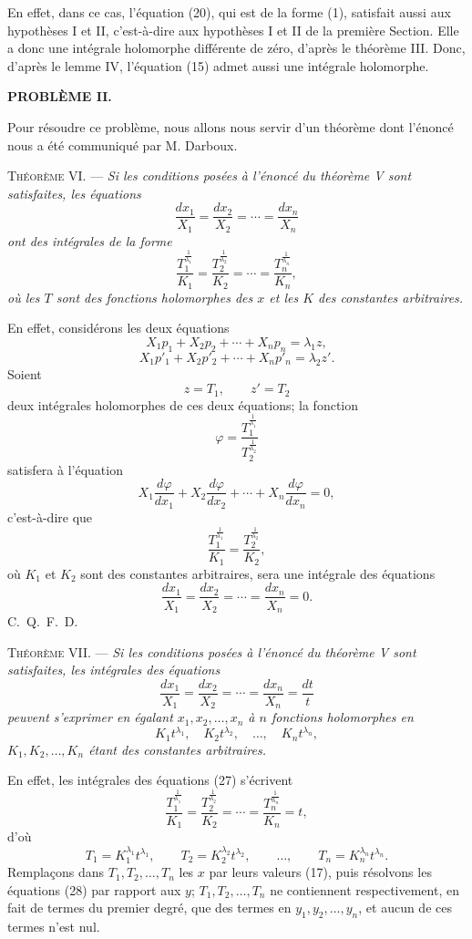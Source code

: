 \documentclass[11pt]{article}
\begin{document}
En effet, dans ce cas, l’équation (20), qui est de la forme (1), satisfait aussi aux hypothèses I et II, c’est-à-dire aux hypothèses I et II de la première Section. Elle a donc une intégrale holomorphe différente de zéro, d’après le théorème III. Donc, d’après le lemme IV, l’équation (15) admet aussi une intégrale holomorphe.

\begin{center}
{\bfseries PROBLÈME II.}
\end{center}

Pour résoudre ce problème, nous allons nous servir d’un théorème dont l’énoncé nous a été communiqué par M. Darboux.

\noindent\textsc{Théorème VI.} --- \emph{Si les conditions posées à l’énoncé du théorème V sont satisfaites, les équations}
\[
\frac{dx_1}{X_1}=\frac{dx_2}{X_2}=\cdots=\frac{dx_n}{X_n}
\]
\emph{ont des intégrales de la forme}
\[
\frac{T_1^{\frac1{\lambda_1}}}{K_1}
=
\frac{T_2^{\frac1{\lambda_2}}}{K_2}
=\cdots=
\frac{T_n^{\frac1{\lambda_n}}}{K_n},
\]
\emph{où les $T$ sont des fonctions holomorphes des $x$ et les $K$ des constantes arbitraires.}

En effet, considérons les deux équations
\[
X_1p_1+X_2p_2+\cdots+X_np_n=\lambda_1z,
\]
\[
X_1p'_1+X_2p'_2+\cdots+X_np'_n=\lambda_2z'.
\]
Soient
\[
z=T_1,\qquad z'=T_2
\]
deux intégrales holomorphes de ces deux équations; la fonction
\[
\varphi=\frac{T_1^{\frac1{\lambda_1}}}{T_2^{\frac1{\lambda_2}}}
\]
satisfera à l’équation
\[
X_1\frac{d\varphi}{dx_1}+X_2\frac{d\varphi}{dx_2}+\cdots+X_n\frac{d\varphi}{dx_n}=0,
\]
c’est-à-dire que
\[
\frac{T_1^{\frac1{\lambda_1}}}{K_1}
=
\frac{T_2^{\frac1{\lambda_2}}}{K_2},
\]
où $K_1$ et $K_2$ sont des constantes arbitraires, sera une intégrale des équations
\[
\frac{dx_1}{X_1}=\frac{dx_2}{X_2}=\cdots=\frac{dx_n}{X_n}=0.
\]
\hfill\mbox{C. Q. F. D.}

\noindent\textsc{Théorème VII.} --- \emph{Si les conditions posées à l’énoncé du théorème V sont satisfaites, les intégrales des équations}
\begin{equation*}\tag{27}
\frac{dx_1}{X_1}=\frac{dx_2}{X_2}=\cdots=\frac{dx_n}{X_n}=\frac{dt}{t}
\end{equation*}
\emph{peuvent s’exprimer en égalant $x_1,x_2,\ldots,x_n$ à $n$ fonctions holomorphes en}
\[
K_1t^{\lambda_1},\quad K_2t^{\lambda_2},\quad \ldots,\quad K_nt^{\lambda_n},
\]
\emph{$K_1,K_2,\ldots,K_n$ étant des constantes arbitraires.}

En effet, les intégrales des équations (27) s’écrivent
\[
\frac{T_1^{\frac1{\lambda_1}}}{K_1}
=
\frac{T_2^{\frac1{\lambda_2}}}{K_2}
=\cdots=
\frac{T_n^{\frac1{\lambda_n}}}{K_n}=t,
\]
d’où
\begin{equation*}\tag{28}
T_1=K_1^{\lambda_1}t^{\lambda_1},
\qquad
T_2=K_2^{\lambda_2}t^{\lambda_2},
\qquad \ldots,
\qquad
T_n=K_n^{\lambda_n}t^{\lambda_n}.
\end{equation*}
Remplaçons dans $T_1,T_2,\ldots,T_n$ les $x$ par leurs valeurs (17), puis résolvons les équations (28) par rapport aux $y$; $T_1,T_2,\ldots,T_n$ ne contiennent respectivement, en fait de termes du premier degré, que des termes en $y_1,y_2,\ldots,y_n$, et aucun de ces termes n’est nul.
\end{document}

